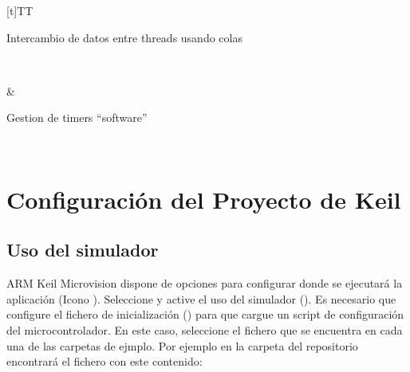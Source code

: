 \documentclass[letterpaper,10pt,english]{sphinxmanual}
\begin{document}
\begin{savenotes}
\begin{tabulary}{\linewidth}[t]{TT}
\begin{varwidth}[t]{}
Intercambio de datos entre threads usando colas
\sphinxbeforeendvarwidth
\end{varwidth}%
\\
\sphinxhline\begin{varwidth}[t]{}
\sphinxAtStartPar
{}
\sphinxbeforeendvarwidth
\end{varwidth}%
&\begin{varwidth}[t]{}
\sphinxAtStartPar
Gestion de timers “software”
\sphinxbeforeendvarwidth
\end{varwidth}%
\\
\sphinxbottomrule
\end{tabulary}
\sphinxtableafterendhook\par
\sphinxattableend\end{savenotes}


\chapter{Configuración del Proyecto de Keil}
\label{\detokenize{cmsis-rtos:configuracion-del-proyecto-de-keil}}

\section{Uso del simulador}
\label{\detokenize{cmsis-rtos:uso-del-simulador}}
\sphinxAtStartPar
ARM Keil Microvision dispone de opciones para configurar donde se ejecutará la aplicación (Icono ). Seleccione  y active el uso del simulador ().
Es necesario que configure el fichero de inicialización () para que cargue un script de configuración del microcontrolador. En este caso, seleccione el fichero  que se encuentra en cada una de las carpetas de ejmplo. Por ejemplo en la carpeta  del repositorio encontrará el fichero  con este contenido:

\begin{sphinxVerbatim}[commandchars=\\\{\},numbers=left,firstnumber=1,stepnumber=1]
\end{sphinxVerbatim}
\end{document}
